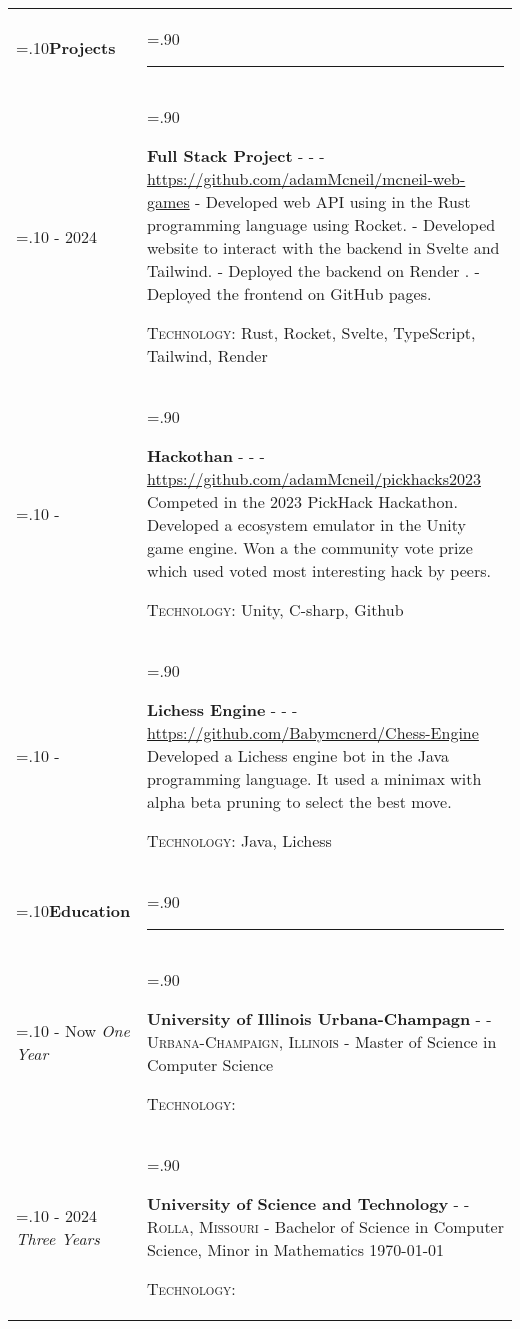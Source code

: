 \documentclass[10pt]{article}
\newcommand{\timeFrame}[3] {
  \if\relax\detokenize{#2}\relax
    #1
  \else
    #1 - #2
  \fi
  \newline
  \scriptsize \textit{#3}
}
\newcommand{\entry}[6] {
  \textbf{#1}
  \if\relax\detokenize{#2}\relax
  \else
       - \textsc{#2}
  \fi
  \if\relax\detokenize{#3}\relax
  \else
      - \textsc{#3}
  \fi
  \if\relax\detokenize{#4}\relax
  \else
      - \href{https://#4}{#4}
  \fi
  \newline #5
  \if\relax\detokenize{#6}\relax
  \else
      \newline \textsc{Technology:} #6
  \fi
  \\
}
\newcommand{\horizontalLine}[0] {
    \noindent\rule{.90\linewidth}{0.4pt}
}
\begin{document}
\begin{tabularx}{\linewidth}{>{\hsize=.10\hsize}X>{\hsize=.90\hsize}X}
\textbf{Projects} & \horizontalLine \\

\timeFrame{2023}{2024}{} &
\entry{Full Stack Project}
  {}
  {}
  {https://github.com/adamMcneil/mcneil-web-games}
  {
  - Developed web API using in the Rust programming language using Rocket. \newline
  - Developed website to interact with the backend in Svelte and Tailwind. \newline
  - Deployed the backend on Render . \newline
  - Deployed the frontend on GitHub pages.
  }
  {Rust, Rocket, Svelte, TypeScript, Tailwind, Render \newline}

\timeFrame{2023}{}{} &
\entry{Hackothan}
  {}
  {}
  {https://github.com/adamMcneil/pickhacks2023}
  {
    Competed in the 2023 PickHack Hackathon.
    Developed a ecosystem emulator in the Unity game engine.
    Won a the community vote prize which used voted most interesting hack by peers.
  }
  {Unity, C-sharp, Github \newline}

\timeFrame{2021}{}{} &
\entry{Lichess Engine}
  {}
  {}
  {https://github.com/Babymcnerd/Chess-Engine }
  {
    Developed a Lichess engine bot in the Java programming language. 
    It used a minimax with alpha beta pruning to select the best move.
  }
  {Java, Lichess \newline}

\textbf{Education} & \horizontalLine \\

\timeFrame{2024}{Now}{One Year} &
\entry{University of Illinois Urbana-Champagn}
  {}
  {Urbana-Champaign, Illinois}
  {}
  {
  Master of Science in Computer Science %
  }
  {}

\timeFrame{2021}{2024}{Three Years} &
\entry{University of Science and Technology}
  {}
  {Rolla, Missouri}
  {}
  {
  Bachelor of Science in Computer Science, Minor in Mathematics \hfill \today
  }
  {}

\end{tabularx}
\end{document}

